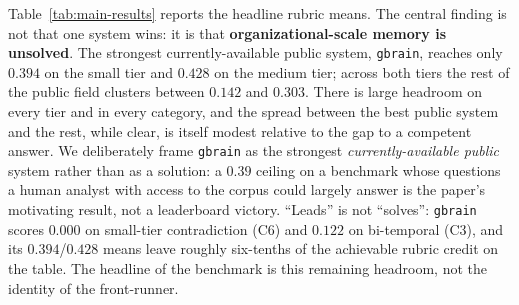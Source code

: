 Table~\ref{tab:main-results} reports the headline rubric means. The central
finding is not that one system wins: it is that \textbf{organizational-scale
memory is unsolved}. The strongest currently-available public system,
\texttt{gbrain}, reaches only $0.394$ on the small tier and $0.428$ on the
medium tier; across both tiers the rest of the public field clusters between
$0.142$ and $0.303$. There is large headroom on every tier and in every
category, and the spread between the best public system and the rest, while
clear, is itself modest relative to the gap to a competent answer. We
deliberately frame \texttt{gbrain} as the strongest \emph{currently-available
public} system rather than as a solution: a $0.39$ ceiling on a benchmark whose
questions a human analyst with access to the corpus could largely answer is the
paper's motivating result, not a leaderboard victory. ``Leads'' is not
``solves'': \texttt{gbrain} scores $0.000$ on small-tier contradiction (C6) and
$0.122$ on bi-temporal (C3), and its $0.394$/$0.428$ means leave roughly
six-tenths of the achievable rubric credit on the table. The headline of the
benchmark is this remaining headroom, not the identity of the front-runner.

